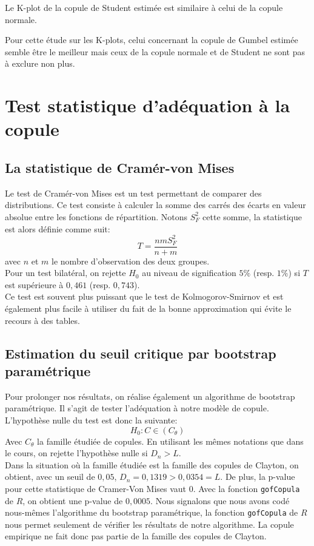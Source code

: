 Le K-plot de la copule de Student estimée est similaire à celui de la copule normale.

Pour cette étude sur les K-plots, celui concernant la copule de Gumbel estimée semble être le meilleur mais ceux de la copule normale et de Student ne sont pas à exclure non plus.

\section{Test statistique d'adéquation à la copule}

\subsection{La statistique de Cramér-von Mises}

Le test de Cramér-von Mises est un test permettant de comparer des distributions. Ce test consiste à calculer la somme des carrés des écarts en valeur absolue entre les fonctions de répartition. Notons $S_F^2$ cette somme, la statistique est alors définie comme suit:
$$T = \frac{nmS_F^2}{n + m} $$
avec $n$ et $m$ le nombre d'observation des deux groupes. \\
Pour un test bilatéral, on rejette $H_0$ au niveau de signification $5\%$ (resp. $1\%$) si $T$ est supérieure à $0,461$ (resp. $0,743$).\\
Ce test est souvent plus puissant que le test de Kolmogorov-Smirnov et est également plus facile à utiliser du fait de la bonne approximation qui évite le recours à des tables.

\subsection{Estimation du seuil critique par bootstrap paramétrique}

Pour prolonger nos résultats, on réalise également un algorithme de bootstrap paramétrique. Il s'agit de tester l'adéquation à notre modèle de copule. L'hypothèse nulle du test est donc la suivante:
$$
H_0 : C \in (C_{\theta})
$$
Avec $C_{\theta}$ la famille étudiée de copules.
En utilisant les mêmes notations que dans le cours, on rejette l'hypothèse nulle si $D_n > L$. \\

Dans la situation où la famille étudiée est la famille des copules de Clayton, on obtient, avec un seuil de $0,05$, $D_n = 0,1319 > 0,0354 = L$. De plus, la p-value pour cette statistique de Cramer-Von Mises vaut $0$. Avec la fonction \lstinline!gofCopula! de $R$, on obtient une p-value de $0,0005$. 
Nous signalons que nous avons codé nous-mêmes l'algorithme du bootstrap paramétrique, la fonction \lstinline!gofCopula! de $R$ nous permet seulement de vérifier les résultats de notre algorithme.
La copule empirique ne fait donc pas partie de la famille des copules de Clayton.

